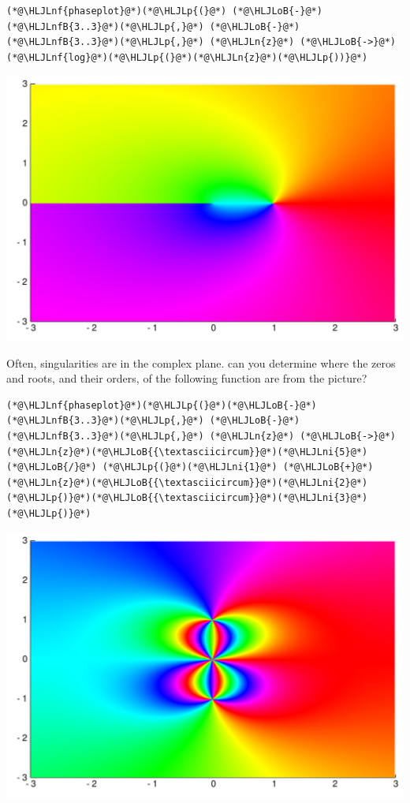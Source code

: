 \documentclass[12pt,a4paper]{article}
\newcommand{\HLJLn}[1]{#1}
\newcommand{\HLJLnf}[1]{\textcolor[RGB]{66,102,213}{#1}}
\newcommand{\HLJLnfB}[1]{\textcolor[RGB]{59,151,46}{#1}}
\newcommand{\HLJLni}[1]{\textcolor[RGB]{59,151,46}{#1}}
\newcommand{\HLJLoB}[1]{\textcolor[RGB]{102,102,102}{\textbf{#1}}}
\newcommand{\HLJLp}[1]{#1}
\begin{document}
\begin{lstlisting}
(*@\HLJLnf{phaseplot}@*)(*@\HLJLp{(}@*) (*@\HLJLoB{-}@*)(*@\HLJLnfB{3..3}@*)(*@\HLJLp{,}@*) (*@\HLJLoB{-}@*)(*@\HLJLnfB{3..3}@*)(*@\HLJLp{,}@*) (*@\HLJLn{z}@*) (*@\HLJLoB{->}@*) (*@\HLJLnf{log}@*)(*@\HLJLp{(}@*)(*@\HLJLn{z}@*)(*@\HLJLp{))}@*)
\end{lstlisting}

\includegraphics[width=\linewidth]{figures/Lecture1_12_1.pdf}

Often, singularities are in the complex plane. can you determine where the zeros and roots, and their orders, of the following function are from the picture?


\begin{lstlisting}
(*@\HLJLnf{phaseplot}@*)(*@\HLJLp{(}@*)(*@\HLJLoB{-}@*)(*@\HLJLnfB{3..3}@*)(*@\HLJLp{,}@*) (*@\HLJLoB{-}@*)(*@\HLJLnfB{3..3}@*)(*@\HLJLp{,}@*) (*@\HLJLn{z}@*) (*@\HLJLoB{->}@*) (*@\HLJLn{z}@*)(*@\HLJLoB{{\textasciicircum}}@*)(*@\HLJLni{5}@*)  (*@\HLJLoB{/}@*) (*@\HLJLp{(}@*)(*@\HLJLni{1}@*) (*@\HLJLoB{+}@*) (*@\HLJLn{z}@*)(*@\HLJLoB{{\textasciicircum}}@*)(*@\HLJLni{2}@*)(*@\HLJLp{)}@*)(*@\HLJLoB{{\textasciicircum}}@*)(*@\HLJLni{3}@*)(*@\HLJLp{)}@*)
\end{lstlisting}

\includegraphics[width=\linewidth]{figures/Lecture1_13_1.pdf}
\end{document}
